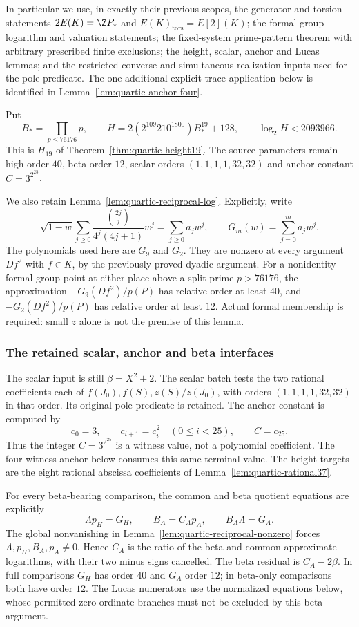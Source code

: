 In particular we use, in exactly their previous scopes, the generator and
torsion statements $2E(K)=\Z P_*$ and $E(K)_{\mathrm{tors}}=E[2](K)$;
the formal-group logarithm and valuation statements; the fixed-system
prime-pattern theorem with arbitrary prescribed finite exclusions; the
height, scalar, anchor and Lucas lemmas; and the restricted-converse and
simultaneous-realization inputs used for the pole predicate. The one
additional explicit trace application below is identified in
Lemma~\ref{lem:quartic-anchor-four}.

Put
\[
 B_* =\prod_{p\le76176}p,\qquad
 H=2(2^{109}210^{1800})B_*^{19}+128,
 \qquad \log_2 H<2093966.
\]
This is $H_{19}$ of Theorem~\ref{thm:quartic-height19}. The
source parameters remain high order $40$, beta order $12$, scalar orders
$(1,1,1,1,32,32)$ and anchor constant $C=3^{2^{25}}$.

We also retain Lemma~\ref{lem:quartic-reciprocal-log}. Explicitly,
write
\[
 \sqrt{1-w}\sum_{j\ge0}\frac{\binom{2j}{j}}{4^j(4j+1)}w^j
       =\sum_{j\ge0}a_jw^j,\qquad
 G_m(w)=\sum_{j=0}^m a_jw^j.
\]
The polynomials used here are $G_9$ and $G_2$. They are nonzero at every
argument $Df^2$ with $f\in K$, by the previously proved dyadic argument.
For a nonidentity formal-group point at either place above a split prime
$p>76176$, the approximation $-G_9(Df^2)/p(P)$ has relative order at least
$40$, and $-G_2(Df^2)/p(P)$ has relative order at least $12$. Actual formal
membership is required: small $z$ alone is not the premise of this lemma.

\subsubsection{The retained scalar, anchor and beta interfaces}
The scalar input is still $\beta=X^2+2$. The scalar batch tests the two
rational coefficients each of $f(J_0),f(S),z(S)/z(J_0)$, with orders
$(1,1,1,1,32,32)$ in that order. Its original pole predicate is retained.
The anchor constant is computed by
\[
 c_0=3,\qquad c_{i+1}=c_i^2\quad(0\le i<25),\qquad C=c_{25}.
\]
Thus the integer $C=3^{2^{25}}$ is a witness value, not a polynomial
coefficient. The four-witness anchor below consumes this same terminal
value. The height targets are the eight rational abscissa coefficients
of Lemma~\ref{lem:quartic-rational37}.

For every beta-bearing comparison, the common and beta quotient equations
are explicitly
\[
 \Lambda p_H=G_H,\qquad B_A=C_Ap_A,\qquad B_A\Lambda=G_A.
\]
The global nonvanishing in Lemma~\ref{lem:quartic-reciprocal-nonzero}
forces $\Lambda,p_H,B_A,p_A\ne0$. Hence $C_A$ is the ratio of the beta
and common approximate logarithms, with their two minus signs cancelled.
The beta residual is $C_A-2\beta$. In full comparisons $G_H$ has order
$40$ and $G_A$ order $12$; in beta-only comparisons both have order $12$.
The Lucas numerators use the normalized equations below, whose permitted
zero-ordinate branches must not be excluded by this beta argument.

